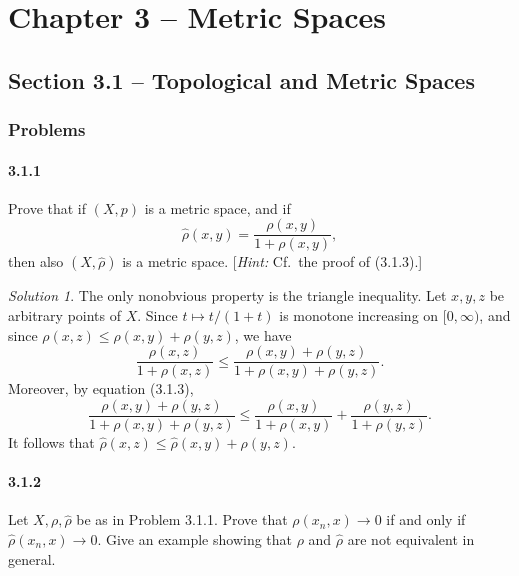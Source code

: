 \documentclass{report}
\theoremstyle{remark}
\newtheorem*{solution}{Solution}
\begin{document}
\chapter*{Chapter 3 -- Metric Spaces}

\section*{Section 3.1 -- Topological and Metric Spaces}

\subsection*{Problems}

\subsubsection*{3.1.1}
Prove that if $(X,p)$ is a metric space, and if
\begin{equation*}
  \hat \rho(x,y) = \frac{\rho(x,y)}{1 + \rho(x,y)},
\end{equation*}
then also $(X,\hat \rho)$ is a metric space. [\emph{Hint:} Cf.\ the proof of (3.1.3).]

\begin{solution}
  The only nonobvious property is the triangle inequality. Let $x,y,z$ be arbitrary points of $X$. Since $t \mapsto t/(1+t)$ is monotone increasing on $[0,\infty)$, and since $\rho(x,z) \le \rho(x,y) + \rho(y,z)$, we have
  \begin{equation*}
    \frac{\rho(x,z)}{1 + \rho(x,z)} \le \frac{\rho(x,y) + \rho(y,z)}{1 + \rho(x,y) + \rho(y,z)}.
  \end{equation*}
  Moreover, by equation (3.1.3),
  \begin{equation*}
    \frac{\rho(x,y) + \rho(y,z)}{1 + \rho(x,y) + \rho(y,z)} \le \frac{\rho(x,y)}{1 + \rho(x,y)} + \frac{\rho(y,z)}{1 + \rho(y,z)}.
  \end{equation*}
  It follows that $\hat \rho(x,z) \le \hat \rho(x,y) + \rho(y,z)$.
\end{solution}

\subsubsection*{3.1.2}
Let $X, \rho, \hat \rho$ be as in Problem 3.1.1. Prove that $\rho(x_n, x) \to 0$ if and only if $\hat \rho(x_n, x) \to 0$. Give an example showing that $\rho$ and $\hat \rho$ are not equivalent in general.
\end{document}

